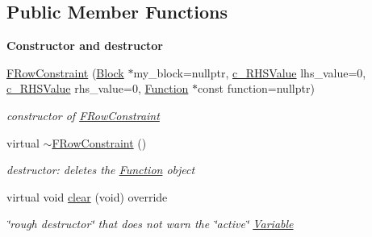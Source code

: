 \subsection*{Public Member Functions}
\begin{Indent}\textbf{ Constructor and destructor}\par
\begin{DoxyCompactItemize}
\item 
\mbox{\hyperlink{class_s_m_spp__di__unipi__it_1_1_f_row_constraint_a7c8c828e00f88dc358bd8a9d83bab5c5}{F\+Row\+Constraint}} (\mbox{\hyperlink{class_s_m_spp__di__unipi__it_1_1_block}{Block}} $\ast$my\+\_\+block=nullptr, \mbox{\hyperlink{class_s_m_spp__di__unipi__it_1_1_row_constraint_a34abd4b01d3a2024be5f6d13dd88779f}{c\+\_\+\+R\+H\+S\+Value}} lhs\+\_\+value=0, \mbox{\hyperlink{class_s_m_spp__di__unipi__it_1_1_row_constraint_a34abd4b01d3a2024be5f6d13dd88779f}{c\+\_\+\+R\+H\+S\+Value}} rhs\+\_\+value=0, \mbox{\hyperlink{class_s_m_spp__di__unipi__it_1_1_function}{Function}} $\ast$const function=nullptr)
\begin{DoxyCompactList}\small\item\em constructor of \mbox{\hyperlink{class_s_m_spp__di__unipi__it_1_1_f_row_constraint}{F\+Row\+Constraint}} \end{DoxyCompactList}\item 
\mbox{\label{class_s_m_spp__di__unipi__it_1_1_f_row_constraint_a7edeb2aa776b58d97ee548e61e754fc4}} 
virtual \mbox{\hyperlink{class_s_m_spp__di__unipi__it_1_1_f_row_constraint_a7edeb2aa776b58d97ee548e61e754fc4}{$\sim$\+F\+Row\+Constraint}} ()
\begin{DoxyCompactList}\small\item\em destructor\+: deletes the \mbox{\hyperlink{class_s_m_spp__di__unipi__it_1_1_function}{Function}} object \end{DoxyCompactList}\item 
virtual void \mbox{\hyperlink{class_s_m_spp__di__unipi__it_1_1_f_row_constraint_a9862fdd31593937c218bbda548c85fcc}{clear}} (void) override
\begin{DoxyCompactList}\small\item\em \char`\"{}rough destructor\char`\"{} that does not warn the \char`\"{}active\char`\"{} \mbox{\hyperlink{class_s_m_spp__di__unipi__it_1_1_variable}{Variable}} \end{DoxyCompactList}\end{DoxyCompactItemize}
\end{Indent}
